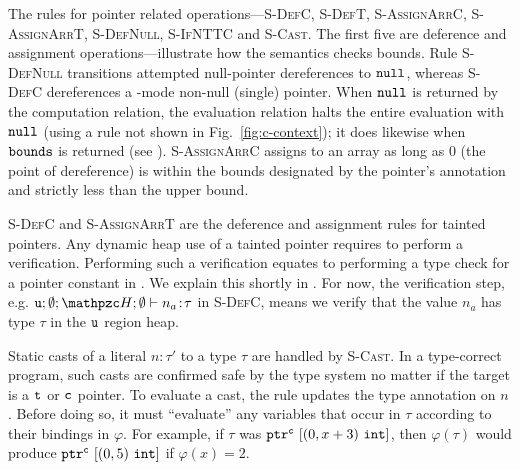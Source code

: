 

%
The rules for pointer related operations---\textsc{S-DefC},
\textsc{S-DefT}, \textsc{S-AssignArrC}, \textsc{S-AssignArrT},
\textsc{S-DefNull}, \textsc{S-IfNTTC} and \textsc{S-Cast}.
The first five are deference and assignment operations---illustrate how the semantics checks bounds.
Rule \textsc{S-DefNull} transitions attempted null-pointer
dereferences to $\mathtt{null}$, whereas \textsc{S-DefC} dereferences a \cmode-mode
non-null (single) pointer.
  When $\mathtt{null}$ is returned by the
computation relation, the evaluation relation halts the entire
evaluation with $\mathtt{null}$ (using a rule not shown in Fig.~\ref{fig:c-context}); it
does likewise when $\mathtt{bounds}$ is returned (see ).
\textsc{S-AssignArrC} assigns to an array as long as 0 (the point of
dereference) is within the bounds designated by the pointer's annotation
and strictly less than the upper bound. 

\textsc{S-DefC} and \textsc{S-AssignArrT} are the deference and assignment rules for tainted pointers.
Any dynamic heap use of a tainted pointer requires to perform a verification.
Performing such a verification equates to performing a type check for a pointer constant in .
We explain this shortly in .
For now, the verification step, e.g. $\umode;\emptyset;\heap ; \emptyset \vdash\evalue{n_a}{\tau}$ in \textsc{S-DefC},
means we verify that the value $n_a$ has type $\tau$ in the $\texttt{u}$ region heap.

Static casts of a literal $n\!:\!\tau'$ to a type $\tau$ are handled
by \textsc{S-Cast}. In a type-correct program, such casts are
confirmed safe by the type system no matter
if the target is a $\texttt{t}$ or $\texttt{c}$ pointer. To evaluate a cast, the rule
updates the type annotation on $n$. Before doing so, it must
``evaluate'' any variables that occur in $\tau$ according to their
bindings in $\varphi$. For example, if $\tau$ was
${\mathtt{ptr}^{\texttt{c}}~{[{({0},{x+3})}~{\mathtt{int}}]}}$, then $\varphi(\tau)$ would
produce ${\mathtt{ptr}^{\texttt{c}}~{[{({0},{5})}~{\mathtt{int}}]}}$ if $\varphi(x) = 2$.

